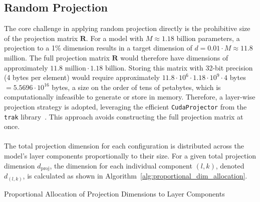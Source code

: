 \subsection{Random Projection}
The core challenge in applying random projection directly is the prohibitive size of the projection matrix $\mathbf{R}$. For a model with $M \approx 1.18$ billion parameters, a projection to a 1\% dimension results in a target dimension of $d = 0.01 \cdot M \approx 11.8$ million. The full projection matrix $\mathbf{R}$ would therefore have dimensions of approximately $11.8 \text{ million} \cdot 1.18 \text{ billion}$. Storing this matrix with 32-bit precision (4 bytes per element) would require approximately $11.8 \cdot 10^6 \cdot 1.18 \cdot 10^9 \cdot 4$ bytes $= 5.5696 \cdot 10^{16}$ bytes, a size on the order of tens of petabytes, which is computationally infeasible to generate or store in memory. Therefore, a layer-wise projection strategy is adopted, leveraging the efficient \texttt{CudaProjector} from the \texttt{trak} library~\cite{park2023trak}. This approach avoids constructing the full projection matrix at once.
\\\\
The total projection dimension for each configuration is distributed across the model's layer components proportionally to their size. For a given total projection dimension $d_\text{proj}$, the dimension for each individual component $(l,k)$, denoted $d_{(l,k)}$, is calculated as shown in Algorithm~\ref{alg:proportional_dim_allocation}.
\begin{algorithm}[ht]
\caption{Proportional Allocation of Projection Dimensions to Layer Components}
\label{alg:proportional_dim_allocation}
\DontPrintSemicolon

\end{algorithm}
